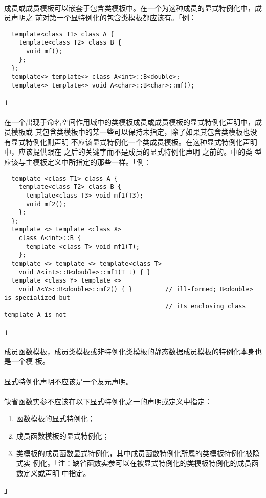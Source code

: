 \paragraph{}
成员或成员模板可以嵌套于包含类模板中。在一个为这种成员的显式特例化中，成员声明之
前对第一个显特例化的包含类模板都应该有。「例：
\begin{lstlisting}
  template<class T1> class A {
    template<class T2> class B {
      void mf();
    };
  };
  template<> template<> class A<int>::B<double>;
  template<> template<> void A<char>::B<char>::mf();
\end{lstlisting}」

\paragraph{}
在一个出现于命名空间作用域中的类模板成员或成员模板的显式特例化声明中，成员模板或
其包含类模板中的某一些可以保持未指定，除了如果其包含类模板也没有显式特例化则声明
不应该显式特例化一个类成员模板。在这种显式特例化声明中，应该提供跟在
之后的关键字而不是成员的显式特例化声明
之前的。中的类
型应该与主模板定义中所指定的那些一样。「例：
\begin{lstlisting}
  template <class T1> class A {
    template<class T2> class B {
      template<class T3> void mf1(T3);
      void mf2();
    };
  };
  template <> template <class X>
    class A<int>::B {
      template <class T> void mf1(T);
    };
  template <> template <> template<class T>
    void A<int>::B<double>::mf1(T t) { }
  template <class Y> template <>
    void A<Y>::B<double>::mf2() { }         // ill-formed; B<double> is specialized but
                                            // its enclosing class template A is not
\end{lstlisting}」

\paragraph{}
成员函数模板，成员类模板或非特例化类模板的静态数据成员模板的特例化本身也是一个模
板。

\paragraph{}
显式特例化声明不应该是一个友元声明。

\paragraph{}
缺省函数实参不应该在以下显式特例化之一的声明或定义中指定：
\begin{enumerate}
  \item{函数模板的显式特例化；}
  \item{成员函数模板的显式特例化；}
  \item{类模板的成员函数显式特例化，其中成员函数特例化所属的类模板特例化被隐式实
    例化。「注：缺省函数实参可以在被显式特例化的类模板特例化的成员函数定义或声明
    中指定。}
\end{enumerate}」

